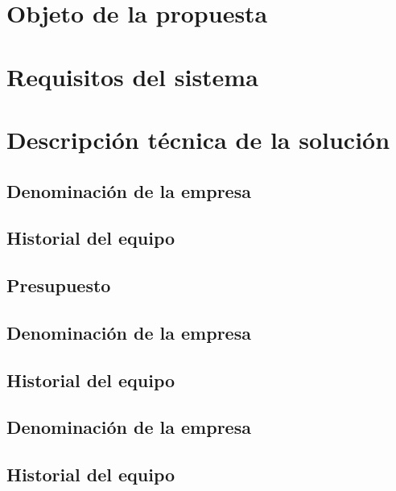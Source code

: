 \documentclass[11pt,spanish]{article}
\begin{document}
\section{Objeto de la propuesta}



\section{Requisitos del sistema}



\section{Descripción técnica de la solución}


\subsection{Denominación de la empresa}


\subsection{Historial del equipo}



\subsection{Presupuesto}


\subsection{Denominación de la empresa}


\subsection{Historial del equipo}


\subsection{Denominación de la empresa}


\subsection{Historial del equipo}

\end{document}
